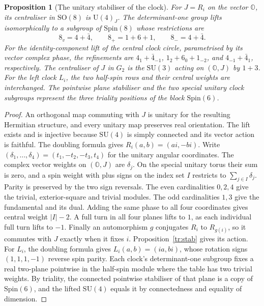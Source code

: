 \documentclass[aps,pra,onecolumn,superscriptaddress,nofootinbib,10pt]{revtex4-2}
\newtheorem{proposition}[theorem]{Proposition}
\theoremstyle{definition}
\theoremstyle{remark}
\newcommand{\SU}{\mathrm{SU}}
\newcommand{\SO}{\mathrm{SO}}
\newcommand{\U}{\mathrm{U}}
\begin{document}
\begin{proposition}[The unitary stabiliser of the clock]\label{tr:clock}
For \(J=R_i\) on the vector \(\mathbb O\), its centraliser in
\(\SO(8)\) is \(\U(4)_J\).
The determinant-one group lifts isomorphically to a subgroup
of \(\mathrm{Spin}(8)\) whose restrictions are
\[
 8_v=4+\bar4,\qquad 8_+=1+6+1,\qquad 8_-=4+\bar4.
\]
For the identity-component lift of the central clock circle,
parametrised by its vector complex phase, the refinements
are \(4_1+\bar4_{-1}\), \(1_2+6_0+1_{-2}\), and
\(4_{-1}+\bar4_1\), respectively.
The centraliser of \(J\) in \(G_2\) is the \(\SU(3)\)
acting on \((\mathbb O,J)\) by \(1+3\).
For the left clock \(L_i\), the two half-spin rows and their
central weights are interchanged. The pointwise plane stabiliser
and the two special unitary clock subgroups represent the three
triality positions of the block \(\mathrm{Spin}(6)\).
\end{proposition}
\begin{proof}
An orthogonal map commuting with \(J\) is unitary for the
resulting Hermitian structure, and every unitary map preserves
real orientation. The lift exists and is injective because
\(\SU(4)\) is simply connected and its vector action
is faithful. The doubling formula gives \(R_i(a,b)=(ai,-bi)\).
Write \((\delta_1,\ldots,\delta_4)=(t_1,-t_2,-t_3,t_4)\)
for the unitary angular coordinates. The complex vector weights
on \((\mathbb O,J)\) are \(\delta_j\).
On the special unitary torus their sum is zero, and a spin weight
with plus signs on the index set \(I\) restricts to
\(\sum_{j\in I}\delta_j\). Parity is preserved by the two sign
reversals. The even cardinalities \(0,2,4\) give the trivial,
exterior-square and trivial modules. The odd cardinalities
\(1,3\) give the fundamental and its dual. Adding the same
phase to all four coordinates gives central weight \(|I|-2\).
A full turn in all four planes lifts to \(1\), as each
individual full turn lifts to \(-1\).
Finally an automorphism \(g\) conjugates \(R_i\) to \(R_{g(i)}\),
so it commutes with \(J\) exactly when it fixes \(i\).
Proposition~\ref{tr:stab} gives its action.
For \(L_i\), the doubling formula gives \(L_i(a,b)=(ia,bi)\),
whose rotation signs \((1,1,1,-1)\) reverse spin parity.
Each clock's determinant-one subgroup fixes a real two-plane
pointwise in the half-spin module where the table has two
trivial weights. By triality, the connected pointwise stabiliser
of that plane is a copy of \(\mathrm{Spin}(6)\), and the lifted
\(\SU(4)\) equals it by connectedness and equality of
dimension.
\end{proof}
\end{document}
